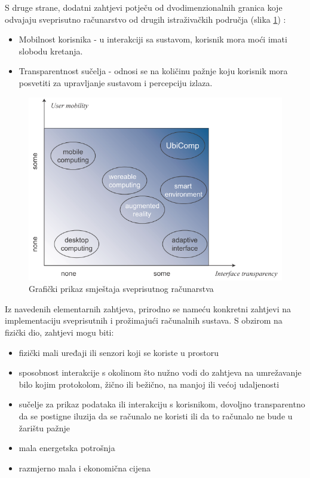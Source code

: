 \documentclass[times, utf8, diplomski, numeric]{fer}
\begin{document}
S druge strane, dodatni zahtjevi potječu od dvodimenzionalnih granica koje
odvajaju sveprisutno računarstvo od drugih istraživačkih područja (slika
\ref{fig:ubiqreq}) \cite{Maffioletti2001}:
\begin{itemize}
  \item Mobilnost korisnika - u interakciji sa sustavom, korisnik mora moći
  imati slobodu kretanja.
  \item Transparentnost sučelja - odnosi se na količinu pažnje koju korisnik
  mora posvetiti za upravljanje sustavom i percepciju izlaza.
\end{itemize}

\begin{figure}[H]
	\centering
	\includegraphics[width=12cm]{images/ubiqreq.png}
	\caption{Grafički prikaz smještaja sveprisutnog računarstva
	\cite{Maffioletti2001}}
	\label{fig:ubiqreq}
\end{figure}

Iz navedenih elementarnih zahtjeva, prirodno se nameću konkretni zahtjevi na
implementaciju sveprisutnih i prožimajući računalnih sustava. S obzirom na
fizički dio, zahtjevi mogu biti:
\begin{itemize}
  \item fizički mali uređaji ili senzori koji se koriste u prostoru
  \item sposobnost interakcije s okolinom što nužno vodi do zahtjeva
  na umrežavanje bilo kojim protokolom, žično ili bežično, na manjoj ili većoj
  udaljenosti
  \item sučelje za prikaz podataka ili interakciju s korisnikom, dovoljno
  transparentno da se postigne iluzija da se računalo ne koristi ili da to
  računalo ne bude u žarištu pažnje
  \item mala energetska potrošnja
  \item razmjerno mala i ekonomična cijena
\end{itemize}
\end{document}
